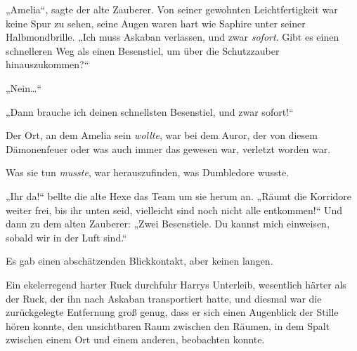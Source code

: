 „Amelia“, sagte der alte Zauberer. Von seiner gewohnten Leichtfertigkeit war keine Spur zu sehen, seine Augen waren hart wie Saphire unter seiner Halbmondbrille.
„Ich muss Askaban verlassen, und zwar \emph{sofort}. Gibt es einen schnelleren Weg als einen Besenstiel, um über die Schutzzauber hinauszukommen?“

„Nein…“

„Dann brauche ich deinen schnellsten Besenstiel, und zwar sofort!“

Der Ort, an dem Amelia sein \emph{wollte}, war bei dem Auror, der von diesem Dämonenfeuer oder was auch immer das gewesen war, verletzt worden war.

Was sie tun \emph{musste}, war herauszufinden, was Dumbledore wusste.

„Ihr da!“ bellte die alte Hexe das Team um sie herum an.
„Räumt die Korridore weiter frei, bis ihr unten seid, vielleicht sind noch nicht alle entkommen!“ Und dann zu dem alten Zauberer:
„Zwei Besenstiele. Du kannst mich einweisen, sobald wir in der Luft sind.“

Es gab einen abschätzenden Blickkontakt, aber keinen langen.

\later

Ein ekelerregend harter Ruck durchfuhr Harrys Unterleib, wesentlich härter als der Ruck, der ihn nach Askaban transportiert hatte, und diesmal war die zurückgelegte Entfernung groß genug, dass er sich einen Augenblick der Stille hören konnte, den unsichtbaren Raum zwischen den Räumen, in dem Spalt zwischen einem Ort und einem anderen, beobachten konnte.

